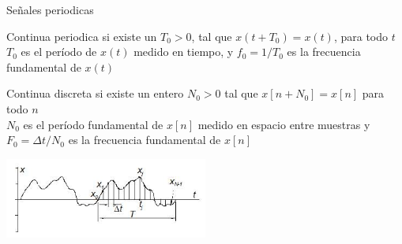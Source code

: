  \begin{frame}{Señales periodicas}
    \begin{block}{Continua periodica}
       si existe un $T_0>0$, tal que $x(t+T_0)=x(t)$, para todo $t$\\
       $T_0$ es el período de $x(t)$ medido en tiempo, y $f_0=1/T_0$ es la frecuencia fundamental de $x(t)$
    \end{block}
    \begin{block}{Continua discreta}
       si existe un entero $N_0>0$ tal que $x[n+N_0]=x[n]$ para
       todo $n$ \\
       $N_0$ es el período fundamental de $x[n]$ medido en espacio entre muestras
       y  $F_0=\Delta t/N_0$ es la frecuencia fundamental de $x[n]$
    \end{block}
    \center\includegraphics[width=0.5\textwidth]{1_clase/periodica}
    \vfill
 \end{frame}
